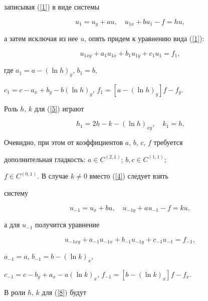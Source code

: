 записывая (\ref{1}) в виде системы


\begin{equation}\label{4}


u_{1}=u_{y}+au,\quad u_{1x}+bu_{1}-f=hu,


\end{equation}


а затем исключая из нее $u$, опять придем к уравнению вида (\ref{1}):


\begin{equation}\label{5}


u_{1xy}+a_{1}u_{1x}+b_{1}u_{1y}+c_{1}u_{1}=f_{1},


\end{equation}


где $a_{1}=a-(\ln h)_{y}$, $b_{1}=b$,


$c_{1}=c-a_{x}+b_{y}-b(\ln h)_{y}$, $f_{1}=[a-(\ln h)_{y}]f-f_{y}$.


Роль $h$, $k$ для (\ref{5}) играют


\begin{equation}\label{6}


h_{1}=2h-k-(\ln h)_{xy},\quad k_{1}=h.


\end{equation}


Очевидно, при этом от коэффициентов $a$, $b$, $c$, $f$ требуется


дополнительная гладкость: $a\in C^{(2,1)}$; $b, c\in C^{(1,1)}$;


$f\in C^{(0,1)}$. В случае $k\ne0$ вместо (\ref{4}) следует взять


систему


\begin{equation}\label{7}


u_{-1}=u_{x}+bu,\quad u_{-1y}+au_{-1}-f=ku,


\end{equation}


а для $u_{-1}$ получится уравнение


\begin{equation}\label{8}


u_{-1xy}+a_{-1}u_{-1x}+b_{-1}u_{-1y}+c_{-1}u_{-1}=f_{-1},


\end{equation}


$a_{-1}=a$, $b_{-1}=b-(\ln k)_{x}$,


$c_{-1}=c-b_{y}+a_{x}-a(\ln k)_{x}$, $f_{-1}=[b-(\ln k)_{x}]f-f_{x}$.


В роли $h$, $k$ для (\ref{8}) будут


